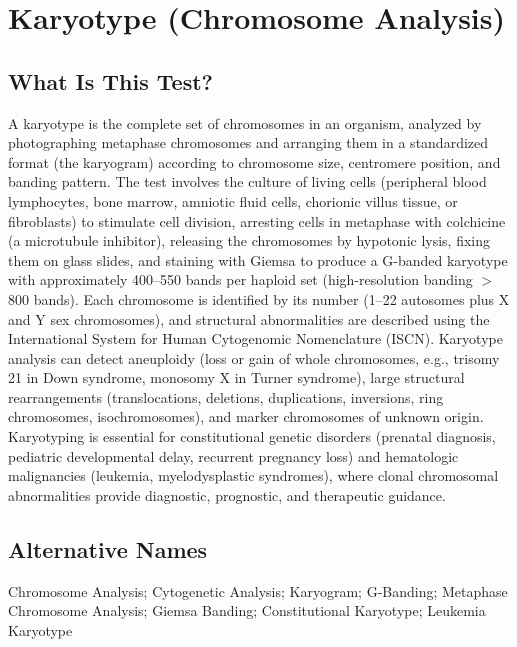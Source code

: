 \chapter{Karyotype (Chromosome Analysis)}

\section*{What Is This Test?}
A karyotype is the complete set of chromosomes in an organism, analyzed by photographing metaphase chromosomes and arranging them in a standardized format (the karyogram) according to chromosome size, centromere position, and banding pattern. The test involves the culture of living cells (peripheral blood lymphocytes, bone marrow, amniotic fluid cells, chorionic villus tissue, or fibroblasts) to stimulate cell division, arresting cells in metaphase with colchicine (a microtubule inhibitor), releasing the chromosomes by hypotonic lysis, fixing them on glass slides, and staining with Giemsa to produce a G-banded karyotype with approximately 400--550 bands per haploid set (high-resolution banding $>$800 bands). Each chromosome is identified by its number (1--22 autosomes plus X and Y sex chromosomes), and structural abnormalities are described using the International System for Human Cytogenomic Nomenclature (ISCN). Karyotype analysis can detect aneuploidy (loss or gain of whole chromosomes, e.g., trisomy 21 in Down syndrome, monosomy X in Turner syndrome), large structural rearrangements (translocations, deletions, duplications, inversions, ring chromosomes, isochromosomes), and marker chromosomes of unknown origin. Karyotyping is essential for constitutional genetic disorders (prenatal diagnosis, pediatric developmental delay, recurrent pregnancy loss) and hematologic malignancies (leukemia, myelodysplastic syndromes), where clonal chromosomal abnormalities provide diagnostic, prognostic, and therapeutic guidance.

\section*{Alternative Names}
Chromosome Analysis; Cytogenetic Analysis; Karyogram; G-Banding; Metaphase Chromosome Analysis; Giemsa Banding; Constitutional Karyotype; Leukemia Karyotype

